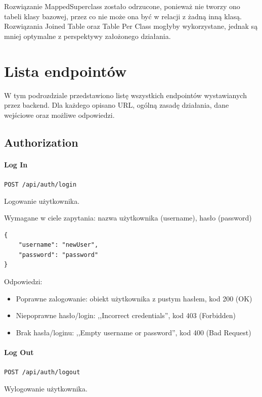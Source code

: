 \documentclass[a4paper,twoside,12pt]{book}
\begin{document}
Rozwiązanie MappedSuperclass zostało odrzucone, ponieważ nie tworzy ono tabeli klasy bazowej, przez co nie może ona być w relacji z żadną inną klasą. Rozwiązania Joined Table oraz Table Per Class mogłyby wykorzystane, jednak są mniej optymalne z perspektywy założonego działania.

\section{Lista endpointów}

W tym podrozdziale przedstawiono listę wszystkich endpointów wystawianych przez backend. Dla każdego opisano URL, ogólną zasadę działania, dane wejściowe oraz możliwe odpowiedzi.

\subsection{Authorization}

\paragraph{Log In}

\texttt{POST /api/auth/login}

Logowanie użytkownika.

Wymagane w ciele zapytania: nazwa użytkownika (username), hasło
(password)

\begin{verbatim}
{
    "username": "newUser",
    "password": "password"
}
\end{verbatim}

Odpowiedzi: 
\begin{itemize}
	\item Poprawne zalogowanie: obiekt użytkownika z pustym hasłem, kod 200 (OK) 
	\item Niepoprawne hasło/login: ,,Incorrect credentials'', kod 403 (Forbidden) 
	\item Brak hasła/loginu: ,,Empty username or password'', kod 400 (Bad Request) 
\end{itemize}

\paragraph{Log Out} 

\texttt{POST /api/auth/logout}



Wylogowanie użytkownika.
\end{document}
